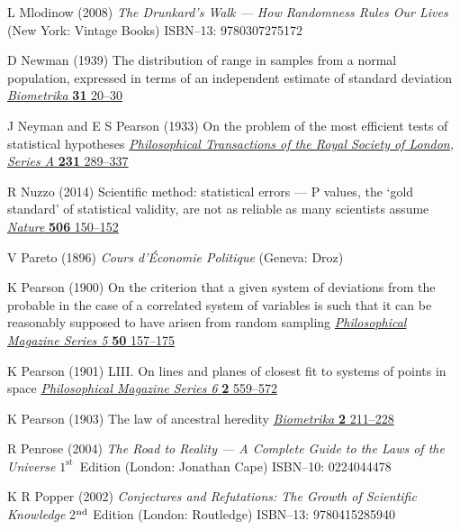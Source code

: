 \begin{thebibliography}{99}
L Mlodinow
(2008) \textit{The Drunkard's Walk --- How Randomness Rules Our 
Lives}
(New York: Vintage Books)
ISBN--13: 9780307275172

D Newman
(1939) The distribution of range in samples from a normal 
population, expressed in terms of an independent estimate of 
standard deviation
\href{http://dx.doi.org/10.1093/biomet/31.1-2.20}{\textit{Biometrika}
\textbf{31} 20--30}

J Neyman and E S Pearson
(1933) On the problem of the most efficient tests of statistical 
hypotheses
\href{http://dx.doi.org/10.1098/rsta.1933.0009}{\textit{Philosophical Transactions of the Royal Society of London, 
Series A} \textbf{231} 289--337}

R Nuzzo
(2014) Scientific method: statistical errors --- P values, the 
`gold standard' of statistical validity, are not as reliable as 
many scientists assume
\href{https://doi.org/10.1038/506150a}{\textit{Nature} \textbf{506} 
150--152}

V Pareto
(1896) \textit{Cours d'\'{E}conomie Politique} (Geneva: Droz)

K Pearson
(1900) On the criterion that a given system of deviations from the 
probable in the case of a correlated system of variables is such 
that it can be reasonably supposed to have arisen from random 
sampling
\href{http://dx.doi.org/10.1080/14786440009463897}{\textit{Philosophical Magazine Series 5} \textbf{50} 157--175}

K Pearson
(1901) LIII. On lines and planes of closest fit to systems of 
points in space
\href{http://dx.doi.org/10.1080/14786440109462720}{\textit{Philosophical Magazine Series 6} \textbf{2} 559--572}

K Pearson
(1903) The law of ancestral heredity
\href{http://dx.doi.org/10.1093/biomet/2.2.211}{\textit{Biometrika} 
\textbf{2} 211--228}

R Penrose
(2004) \textit{The Road to Reality --- A Complete Guide to the Laws
of the Universe}
$1^{\text{st}}$~Edition (London: Jonathan Cape)
ISBN--10: 0224044478

K R Popper
(2002) \textit{Conjectures and Refutations: The Growth of
Scientific Knowledge} 2$^{\rm nd}$ Edition (London: Routledge)
ISBN--13: 9780415285940


\end{thebibliography}
